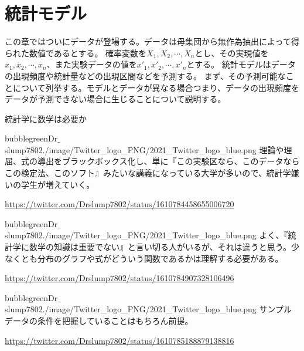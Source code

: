 \chapter{統計モデル}
この章ではついにデータが登場する。データは母集団から無作為抽出によって得られた数値であるとする。
確率変数を$X_1,X_2,\cdots,X_n$とし、その実現値を$x_1,x_2,\cdots,x_n$、また実験データの値を$x'_1,x'_2,\cdots,x'_n$とする。
統計モデルはデータの出現頻度や統計量などの出現区間などを予測する。
まず、その予測可能なことについて列挙する。モデルとデータが異なる場合つまり、データの出現頻度をデータが予測できない場合に生じることについて説明する。
\begin{SMbox}{統計学に数学は必要か}

    \begin{rightbubbles}{bubblegreen}{Dr$\_$slump7802}{./image/Twitter_logo_PNG/2021_Twitter_logo_blue.png}
        理論や理屈、式の導出をブラックボックス化し、単に『この実験区なら、このデータならこの検定法、このソフト』みたいな講義になっている大学が多いので、統計学嫌いの学生が増えていく。

            \begin{flushright} 
                \small	\url{https://twitter.com/Drslump7802/status/1610784458655006720}
            \end{flushright}    
    \end{rightbubbles}

    \begin{rightbubbles}{bubblegreen}{Dr$\_$slump7802}{./image/Twitter_logo_PNG/2021_Twitter_logo_blue.png}
        よく、『統計学に数学の知識は重要でない』と言い切る人がいるが、それは違うと思う。少なくとも分布のグラフや式がどういう関数であるかは理解する必要がある。

            \begin{flushright} 
                \small	\url{https://twitter.com/Drslump7802/status/1610784907328106496}
            \end{flushright}    
        \end{rightbubbles}

    \begin{rightbubbles}{bubblegreen}{Dr$\_$slump7802}{./image/Twitter_logo_PNG/2021_Twitter_logo_blue.png}
        サンプルデータの条件を把握していることはもちろん前提。
            \begin{flushright} 
                \small	\url{https://twitter.com/Drslump7802/status/1610785188879138816}
            \end{flushright}    
        \end{rightbubbles}


\end{SMbox}
